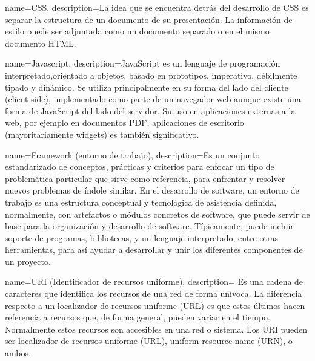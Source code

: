 {name=CSS,
description={La idea que se encuentra detrás del desarrollo de CSS es separar la estructura de un documento de su presentación. La información de estilo puede ser adjuntada como un documento separado o en el mismo documento HTML.}
}

{name=Javascript,
description={JavaScript es un lenguaje de programación interpretado,orientado a objetos, basado en prototipos, imperativo, débilmente tipado y dinámico. Se utiliza principalmente en su forma del lado del cliente (client-side), implementado como parte de un navegador web aunque existe una forma de JavaScript del lado del servidor. Su uso en aplicaciones externas a la web, por ejemplo en documentos PDF, aplicaciones de escritorio (mayoritariamente widgets) es también significativo.}
}

{name=Framework (entorno de trabajo),
 description={Es un conjunto estandarizado de conceptos, prácticas y criterios para enfocar un tipo de problemática particular que sirve como referencia, para enfrentar y resolver nuevos problemas de índole similar.
 En el desarrollo de software, un entorno de trabajo es una estructura conceptual y tecnológica de asistencia definida, normalmente, con artefactos o módulos concretos de software, que puede servir de base para la organización y desarrollo de software. Típicamente, puede incluir soporte de programas, bibliotecas, y un lenguaje interpretado, entre otras herramientas, para así ayudar a desarrollar y unir los diferentes componentes de un proyecto.}
 }

{name=URI (Identificador de recursos uniforme),
 description={ Es una cadena de caracteres que identifica los recursos de una red de forma unívoca. La diferencia respecto a un localizador de recursos uniforme (URL) es que estos últimos hacen referencia a recursos que, de forma general, pueden variar en el tiempo. Normalmente estos recursos son accesibles en una red o sistema. Los URI pueden ser localizador de recursos uniforme (URL), uniform resource name (URN), o ambos.}
 }


